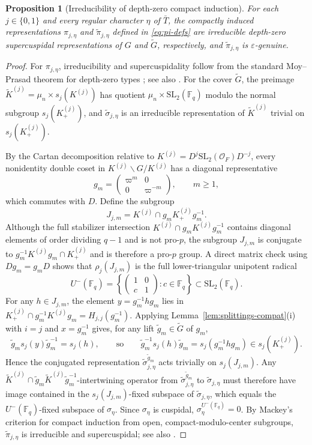 \documentclass[12pt, letterpaper]{article}
\numberwithin{equation}{section}
\newtheorem{proposition}[theorem]{Proposition}
\theoremstyle{definition}
\theoremstyle{remark}
\newcommand{\OO}{\mathcal{O}_F}
\newcommand{\kk}{\mathbb{F}_q}
\newcommand{\Gbar}{\mathrm{SL}_2(\kk)}
\newcommand{\wtG}{\widetilde{G}}
\begin{document}
\begin{proposition}[Irreducibility of depth-zero compact induction]\label{prop:types}
For each $j\in\{0,1\}$ and every regular character $\eta$ of $\bar{T}$, the compactly induced representations $\pi_{j,\eta}$ and $\widetilde{\pi}_{j,\eta}$ defined in \eqref{eq:pi-defs} are irreducible depth-zero supercuspidal representations of $G$ and $\wtG$, respectively, and $\widetilde{\pi}_{j,\eta}$ is $\varepsilon$-genuine.
\end{proposition}
\begin{proof}
For $\pi_{j,\eta}$, irreducibility and supercuspidality follow from the standard Moy--Prasad theorem for depth-zero types \cite{MP96}; see also \cite[\S 19]{BH06}. For the cover $\wtG$, the preimage $\widetilde{K}^{(j)}=\mu_n\times s_j(K^{(j)})$ has quotient $\mu_n\times\Gbar$ modulo the normal subgroup $s_j(K^{(j)}_+)$, and $\widetilde{\sigma}_{j,\eta}$ is an irreducible representation of $\widetilde{K}^{(j)}$ trivial on $s_j(K^{(j)}_+)$.

By the Cartan decomposition relative to $K^{(j)}=D^j\mathrm{SL}_2(\OO)D^{-j}$, every nonidentity double coset in $K^{(j)}\backslash G/K^{(j)}$ has a diagonal representative
\[
 g_m=\begin{pmatrix}\varpi^m&0\\0&\varpi^{-m}\end{pmatrix},\qquad m\ge 1,
\]
which commutes with $D$. Define the subgroup
\[
 J_{j,m}=K^{(j)}\cap g_m K^{(j)}_+ g_m^{-1}.
\]
Although the full stabilizer intersection $K^{(j)}\cap g_m K^{(j)}g_m^{-1}$ contains diagonal elements of order dividing $q-1$ and is not pro-$p$, the subgroup $J_{j,m}$ is conjugate to $g_m^{-1}K^{(j)}g_m\cap K^{(j)}_+$ and is therefore a pro-$p$ group. A direct matrix check using $Dg_m=g_mD$ shows that $\rho_j(J_{j,m})$ is the full lower-triangular unipotent radical
\[
 U^-(\kk)=\left\{\begin{pmatrix}1&0\\ c&1\end{pmatrix}:c\in\kk\right\}\subset\Gbar.
\]
For any $h\in J_{j,m}$, the element $y=g_m^{-1}hg_m$ lies in $K^{(j)}_+\cap g_m^{-1}K^{(j)}g_m=H_{j,j}(g_m^{-1})$. Applying Lemma~\ref{lem:splittings-compat}(i) with $i=j$ and $x=g_m^{-1}$ gives, for any lift $\widetilde{g}_m\in\wtG$ of $g_m$,
\[
 \widetilde{g}_m s_j(y)\widetilde{g}_m^{-1}=s_j(h),\qquad\text{so}\qquad
 \widetilde{g}_m^{-1}s_j(h)\widetilde{g}_m=s_j(g_m^{-1}hg_m)\in s_j(K^{(j)}_+).
\]
Hence the conjugated representation $\widetilde{\sigma}_{j,\eta}^{\widetilde{g}_m}$ acts trivially on $s_j(J_{j,m})$. Any $\widetilde{K}^{(j)}\cap\widetilde{g}_m\widetilde{K}^{(j)}\widetilde{g}_m^{-1}$-intertwining operator from $\widetilde{\sigma}_{j,\eta}^{\widetilde{g}_m}$ to $\widetilde{\sigma}_{j,\eta}$ must therefore have image contained in the $s_j(J_{j,m})$-fixed subspace of $\widetilde{\sigma}_{j,\eta}$, which equals the $U^-(\kk)$-fixed subspace of $\sigma_\eta$. Since $\sigma_\eta$ is cuspidal, $\sigma_\eta^{U^-(\kk)}=0$. By Mackey's criterion for compact induction from open, compact-modulo-center subgroups, $\widetilde{\pi}_{j,\eta}$ is irreducible and supercuspidal; see also \cite[Thm.~3.5]{HW09}.
\end{proof}
\end{document}
